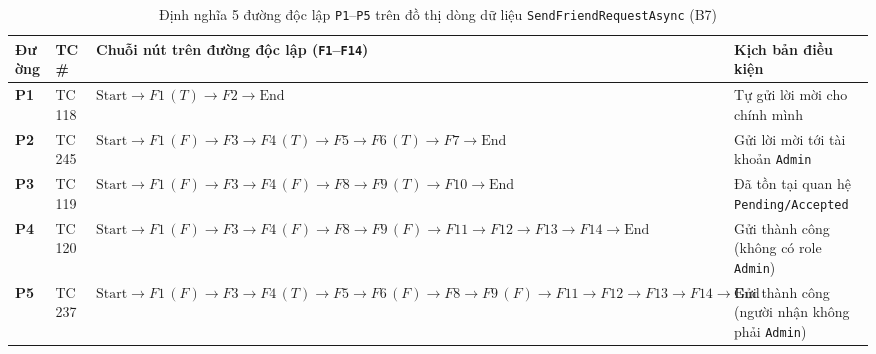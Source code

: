 \documentclass[11pt,a4paper]{article}
\begin{document}
\begin{table}[H]
\centering
\scriptsize
\setlength{\tabcolsep}{4pt}
\begin{tabularx}{\textwidth}{|C{1.1cm}|C{1.3cm}|X|L{4.2cm}|}
\hline
{}
\textbf{Đường} & \textbf{TC\#} & \textbf{Chuỗi nút trên đường độc lập (\texttt{F1}--\texttt{F14})} & \textbf{Kịch bản điều kiện} \tabularnewline
\hline
\textbf{P1} & TC 118 & $\text{Start} \rightarrow F1\,(T) \rightarrow F2 \rightarrow \text{End}$ & Tự gửi lời mời cho chính mình \\ \hline
\textbf{P2} & TC 245 & $\text{Start} \rightarrow F1\,(F) \rightarrow F3 \rightarrow F4\,(T) \rightarrow F5 \rightarrow F6\,(T) \rightarrow F7 \rightarrow \text{End}$ & Gửi lời mời tới tài khoản \texttt{Admin} \\ \hline
\textbf{P3} & TC 119 & $\text{Start} \rightarrow F1\,(F) \rightarrow F3 \rightarrow F4\,(F) \rightarrow F8 \rightarrow F9\,(T) \rightarrow F10 \rightarrow \text{End}$ & Đã tồn tại quan hệ \texttt{Pending/Accepted} \\ \hline
\textbf{P4} & TC 120 & $\text{Start} \rightarrow F1\,(F) \rightarrow F3 \rightarrow F4\,(F) \rightarrow F8 \rightarrow F9\,(F) \rightarrow F11 \rightarrow F12 \rightarrow F13 \rightarrow F14 \rightarrow \text{End}$ & Gửi thành công (không có role \texttt{Admin}) \\ \hline
\textbf{P5} & TC 237 & $\text{Start} \rightarrow F1\,(F) \rightarrow F3 \rightarrow F4\,(T) \rightarrow F5 \rightarrow F6\,(F) \rightarrow F8 \rightarrow F9\,(F) \rightarrow F11 \rightarrow F12 \rightarrow F13 \rightarrow F14 \rightarrow \text{End}$ & Gửi thành công (người nhận không phải \texttt{Admin}) \\ \hline
\end{tabularx}
\caption{Định nghĩa 5 đường độc lập \texttt{P1}--\texttt{P5} trên đồ thị dòng dữ liệu \texttt{SendFriendRequestAsync} (B7)}
\end{table}
\end{document}
